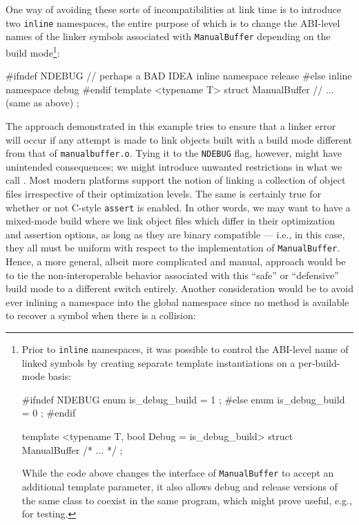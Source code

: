 One way of avoiding these sorts of incompatibilities at link time is to
introduce two \lstinline!inline! namespaces, the entire purpose of which is
to change the ABI-level names of the linker symbols associated with
\lstinline!ManualBuffer! depending on the build mode{\cprotect\footnote{Prior
to \lstinline!inline! namespaces, it was possible to control the
ABI-level name of linked symbols by creating separate template
instantiations on a per-build-mode basis:

\begin{emcppslisting}[style=footcode]
#ifndef NDEBUG
enum { is_debug_build = 1 };
#else
enum { is_debug_build = 0 };
#endif

template <typename T, bool Debug = is_debug_build>
struct ManualBuffer { /* ... */ };
\end{emcppslisting}
    
\noindent While the code above changes the interface of \lstinline!ManualBuffer! to
accept an additional template parameter, it also allows debug and
release versions of the same class to coexist in the same program,
  which might prove useful, e.g., for testing.}}:

\begin{emcppslisting}
#ifndef NDEBUG            // perhaps a BAD IDEA
inline namespace release
#else
inline namespace debug
#endif
{
    template <typename T>
    struct ManualBuffer
    {
        // ... (same as above)
    };
}
\end{emcppslisting}
    
\noindent The approach demonstrated in this example tries to ensure that a linker
error will occur if any attempt is made to link objects built with a
build mode different from that of \mbox{\lstinline!manualbuffer.o!}. Tying it to
the \lstinline!NDEBUG! flag, however, might have unintended consequences;
we might introduce unwanted restrictions in what we call
. Most modern platforms support the notion of
linking a collection of object files irrespective of their
optimization levels. The same is certainly true for whether or not
C-style \lstinline!assert! is enabled. In other words, we may want to have
a mixed-mode build where we link object files which differ in their optimization and assertion options, as long as they are binary compatible --- i.e., in this case, they all must be uniform with respect to the implementation of \lstinline!ManualBuffer!.  Hence, a more general, albeit more complicated and
manual, approach would be to tie the non-interoperable behavior
associated with this ``safe'' or ``defensive'' build mode to a different
switch entirely. Another consideration would be to avoid ever inlining a
namespace into the global namespace since no method is available to
recover a symbol when there is a collision:

